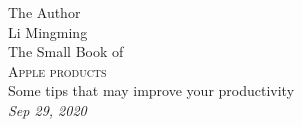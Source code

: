 \begin{titlepage}
  \raggedleft
      {\Large The Author\\ Li Mingming\\[1in] }
  {\large The Small Book of\\}
  {\Huge\scshape Apple products\\[.2in]}
  {\large Some tips that may improve your productivity\\}
  \vfill
  {\itshape Sep 29, 2020}
\end{titlepage}

